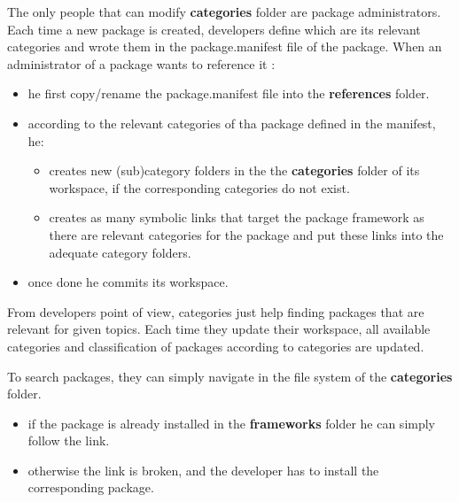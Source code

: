 \documentclass[12pt,a4paper]{article}
\begin{document}
The only people that can modify \textbf{categories} folder are package administrators. Each time a new package is created, developers define which are its relevant categories and wrote them in the package.manifest file of the package. When an administrator of a package wants to reference it :
\begin{itemize}
\item he first copy/rename the package.manifest file into the \textbf{references} folder.
\item according to the relevant categories of tha package defined in the manifest, he:
\begin{itemize}
\item creates new (sub)category folders in the the \textbf{categories} folder of its workspace, if the corresponding categories do not exist.
\item creates as many symbolic links that target the package framework as there are relevant categories for the package and put these links into the adequate category folders.
\end{itemize}
\item once done he commits its workspace.
\end{itemize}

From developers point of view, categories just help finding packages that are relevant for given topics. Each time they update their workspace, all available categories and classification of packages according to categories are updated. 

To search packages, they can simply navigate in the file system of the \textbf{categories} folder. 
\begin{itemize}
\item if the package is already installed in the \textbf{frameworks} folder he can simply follow the link.
\item otherwise the link is broken, and the developer has to install the corresponding package.
\end{itemize}
\end{document}
